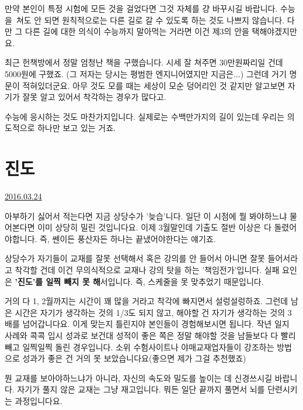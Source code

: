 만약 본인이 특정 시험에 모든 것을 걸었다면 그것 자체를 걍 바꾸시길 바랍니다.
수능을 쳐도 안 되면 원칙적으로는 다른 길로 갈 수 있도록 하는 것도 나쁘지 않습니다.
다만 그 다른 길에 대한 의식이 수능까지 말아먹는 거라면 이건 제3의 안을 택해야겠지만요.
\vspace{5mm}

최근 헌책방에서 정말 엄청난 책을 구했습니다. 시세 잘 쳐주면 30만원짜리일 건데 5000원에 구했죠.
(그 저자는 당시는 평범한 엔지니어였지만 지금은...)
그런데 거기 명문이 적혀있더군요. 아무 것도 모를 때는 세상이 모순 덩어리인 것 같지만
알고보면 자기가 잘못 알고 있어서 착각하는 경우가 많다고.
\vspace{5mm}

수능에 응시하는 것도 마찬가지입니다. 실제로는 수백만가지의 길이 있는데 우리는 의도적으로 하나만 보고 있는 거죠.
\vspace{5mm}






\section{진도}
\href{https://www.kockoc.com/Apoc/692514}{2016.03.24}

\vspace{5mm}

아부하기 싫어서 적는다면 지금 상당수가 '늦습'니다.
일단 이 시점에 뭘 봐야하느냐 물어본다면 이미 상당히 밀린 것입니다요.
이제 3월말인데 기출도 절반 이상은 다 돌렸어야합니다. 즉, 쎈이든 풍산자든 하나는 끝냈어야한다는 얘기죠.
\vspace{5mm}

상당수가 자기들이 교재를 잘못 선택해서 혹은 강의를 안 들어서 아니면 잘못 들어서라고 착각할 건데
이건 무의식적으로 교재나 강의 탓을 하는 '책임전가'입니다.
실패 요인은 \textbf{'진도'를 일찍 빼지 못 해}서입니다.
즉, 스케줄을 못 맞추었기 때문입니다.
\vspace{5mm}

거의 다 1, 2월까지는 시간이 꽤 많을 거라고 착각에 빠지면서 설렁설렁하죠.
그런데 남은 시간은 자기가 생각하는 것의 1/3도 되지 않고, 해야할 건 자기가 생각하는 것의 3배를 넘어갑니다요.
이게 맞는지 틀린지야 본인들이 경험해보시면 됩니다.
작년 일지 사례와 콕콕 입시 성과로 보건대 성적이 좋은 쪽은 정말 해야할 것을 남들보다 다 빨리 빼고 일찍일찍 돌린 경우입니다.
소위 수험사이트나 야매교재업자들이 강조하는 방법으로 성과가 좋은 건 거의 못 보았습니다요(좋으면 제가 그걸 추천했죠)
\vspace{5mm}

뭔 교재를 보아야하느냐가 아니라, 자신의 속도와 밀도를 높이는 데 신경쓰시길 바랍니다.
자기가 풀지 않은 교재는 그냥 재고입니다. 뭐든 일단 끝까지 풀면서 뇌를 단련시키는 과정입니다요.
\vspace{5mm}

